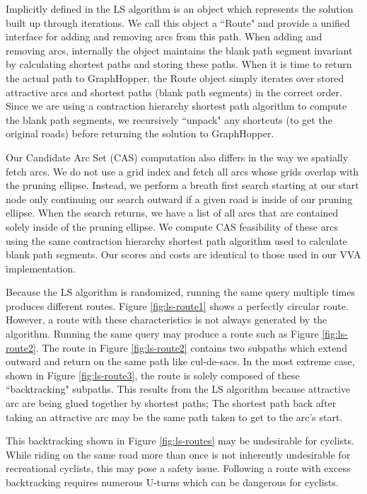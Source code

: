 \documentclass[honors]{union-cs-thesis}
\begin{document}
Implicitly defined in the LS algorithm is an object which represents the solution built up through iterations. We call this object a ``Route" and provide a unified interface for adding and removing arcs from this path. When adding and removing arcs, internally the object maintains the blank path segment invariant by calculating shortest paths and storing these paths. When it is time to return the actual path to GraphHopper, the Route object simply iterates over stored attractive arcs and shortest paths (blank path segments) in the correct order. Since we are using a contraction hierarchy shortest path algorithm to compute the blank path segments, we recursively ``unpack" any shortcuts (to get the original roads) before returning the solution to GraphHopper. 

Our Candidate Arc Set (CAS) computation also differs in the way we spatially fetch arcs. We do not use a grid index and fetch all arcs whose grids overlap with the pruning ellipse.  Instead, we perform a breath first search starting at our start node only continuing our search outward if a given road is inside of our pruning ellipse. When the search returns, we have a list of all arcs that are contained solely inside of the pruning ellipse. We compute CAS feasibility of these arcs using the same contraction hierarchy shortest path algorithm used to calculate blank path segments. Our scores and costs are identical to those used in our VVA implementation.

Because the LS algorithm is randomized, running the same query multiple times produces different routes. Figure \ref{fig:ls-route1} shows a perfectly circular route. However, a route with these characteristics is not always generated by the algorithm. Running the same query may produce a route such as Figure \ref{fig:ls-route2}. The route in Figure \ref{fig:ls-route2} contains two subpaths which extend outward and return on the same path like cul-de-sacs. In the most extreme case, shown in Figure \ref{fig:ls-route3}, the route is solely composed of these ``backtracking" subpaths. This results from the LS algorithm because attractive arc are being glued together by shortest paths; The shortest path back after taking an attractive arc may be the same path taken to get to the arc's start.

This backtracking shown in Figure \ref{fig:ls-routes} may be undesirable for cyclists. While riding on the same road more than once is not inherently undesirable for recreational cyclists, this may pose a safety issue. Following a route with excess backtracking requires numerous U-turns which can be dangerous for cyclists.  
\end{document}
